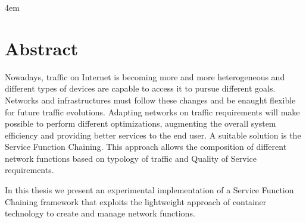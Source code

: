 \cleardoublepage
{}

\vspace*{\fill}

\vspace*{-5cm}

\thispagestyle{empty}

\par
\begingroup
\leftskip4em
\rightskip\leftskip
\section*{\centering Abstract}
Nowadays, traffic on Internet is becoming more and more heterogeneous and
different types of devices are capable to access it to pursue different goals.
Networks and infrastructures must follow these changes and be enaught flexible
for future traffic evolutions. Adapting networks on traffic requirements will
make possible to perform different optimizations, augmenting the overall system
efficiency and providing better services to the end user. A suitable solution is
the Service Function Chaining. This approach allows the composition of different
network functions based on typology of traffic and Quality of Service
requirements. 

In this thesis we present an experimental implementation of a Service Function
Chaining framework that exploits the lightweight approach of container
technology to create and manage network functions.
\par\endgroup
\vspace*{\fill}
